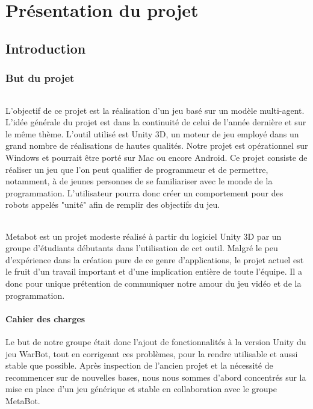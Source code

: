 \documentclass{report}
\begin{document}
\newpage
\tableofcontents
\newpage

\part{Présentation du projet}
\chapter{Introduction}
\section{But du projet}
\paragraph{}
L'objectif de ce projet est la réalisation d'un jeu basé sur un modèle multi-agent. L'idée générale du projet est dans la continuité de celui de l'année dernière et sur le même thème. L'outil utilisé est Unity 3D, un moteur de jeu employé dans un grand nombre de réalisations de hautes qualités. Notre projet est opérationnel sur Windows et pourrait être porté sur Mac ou encore Android.
Ce projet consiste de réaliser un jeu que l'on peut qualifier de programmeur et de permettre, notamment, à de jeunes personnes de se familiariser avec le monde de la programmation. L'utilisateur pourra donc créer un comportement pour des robots appelés "unité" afin de remplir des objectifs du jeu.
\paragraph{}
Metabot est un projet modeste réalisé à partir du logiciel Unity 3D par un groupe d'étudiants débutants dans l'utilisation de cet outil. Malgré le peu d'expérience dans la création pure de ce genre d'applications, le projet actuel est le fruit d'un travail important et d'une implication entière de toute l'équipe.
Il a donc pour unique prétention de communiquer notre amour du jeu vidéo et de la programmation.
\subsection{Cahier des charges}
Le but de notre groupe était donc l’ajout de fonctionnalités à la version Unity du jeu WarBot, tout en corrigeant ces problèmes, pour la rendre utilisable et aussi stable que possible. 
Après inspection de l’ancien projet et la nécessité de recommencer sur de nouvelles bases, nous nous sommes d’abord concentrés sur la mise en place d’un jeu générique et stable en collaboration avec le groupe MetaBot.
\end{document}
